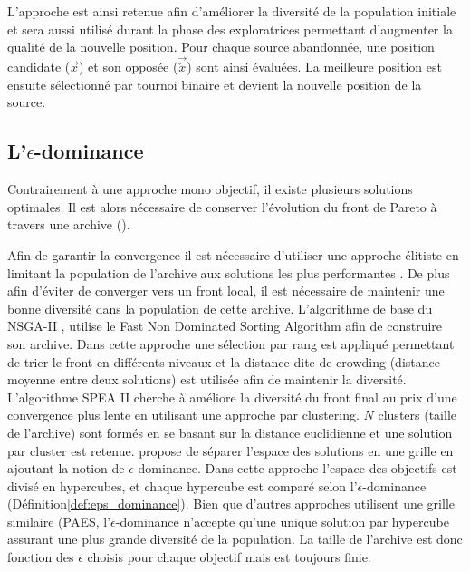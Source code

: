 L’approche est ainsi retenue afin d’améliorer la diversité de la population initiale
et sera aussi utilisé durant la phase des exploratrices permettant d’augmenter la qualité
de la nouvelle position.
Pour chaque source abandonnée, une position candidate ($\vec{x}$) et son opposée ($\vec{\check{x}}$) sont
ainsi évaluées. La meilleure position est ensuite sélectionné par tournoi binaire et
devient la nouvelle position de la source.


\subsection[L’epsilon-dominance]{L’$\epsilon$-dominance} %
\label{sub:l_epsilon_dominance}
Contrairement à une approche mono objectif, il existe plusieurs solutions optimales.
Il est alors nécessaire de conserver l’évolution du front de Pareto à travers une
archive ().


Afin de garantir la convergence il est nécessaire d’utiliser une approche élitiste
en limitant la population de l’archive aux solutions les plus performantes \parencite{Zitzler2000173}.
De plus afin d’éviter de converger vers un front local, il est nécessaire de maintenir une
bonne diversité dans la population de cette archive.
L’algorithme de base du NSGA-II \parencite{Deb2002182}, utilise le Fast Non
Dominated Sorting Algorithm afin de construire son archive. Dans cette approche une sélection par rang
est appliqué permettant de trier le front en différents niveaux et la distance dite
de crowding (distance moyenne entre deux solutions) est utilisée afin de maintenir la diversité.
L’algorithme SPEA II cherche à améliore la diversité du front final au prix d’une convergence
plus lente en utilisant une approche par clustering. $N$ clusters (taille de l’archive)
sont formés en se basant sur la distance euclidienne et une solution par cluster
est retenue.
\cite{Laumanns2002263} propose de séparer l’espace des solutions en une grille en ajoutant la notion
de $\epsilon$-dominance. Dans cette approche l’espace des objectifs est divisé en hypercubes,
et chaque hypercube est comparé selon l’$\epsilon$-dominance (Définition\ref{def:eps_dominance}).
Bien que d’autres approches utilisent une grille similaire (PAES, \cite{Knowles2000149}
l’$\epsilon$-dominance n’accepte qu’une unique solution par hypercube assurant une
plus grande diversité de la population. La taille de l’archive est donc fonction
des $\epsilon$ choisis pour chaque objectif mais est toujours finie.



